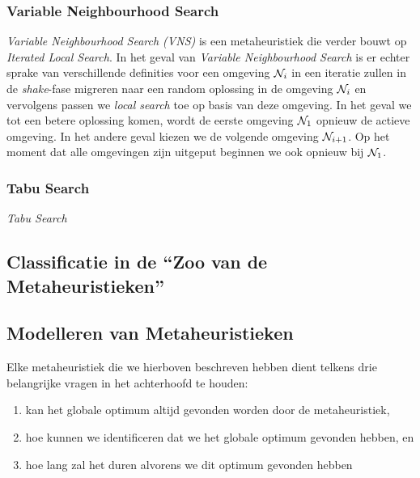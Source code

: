 \subsubsection{Variable Neighbourhood Search}

\emph{Variable Neighbourhood Search (VNS)} is een metaheuristiek die verder bouwt op \emph{Iterated Local Search}. In het geval van \emph{Variable Neighbourhood Search} is er echter sprake van verschillende definities voor een omgeving $\mathcal{N}_i$ in een iteratie zullen in de \emph{shake}-fase migreren naar een random oplossing in de omgeving $\mathcal{N}_i$ en vervolgens passen we \emph{local search} toe op basis van deze omgeving. In het geval we tot een betere oplossing komen, wordt de eerste omgeving $\mathcal{N}_1$ opnieuw de actieve omgeving. In het andere geval kiezen we de volgende omgeving $\mathcal{N}_{i+1}$. Op het moment dat alle omgevingen zijn uitgeput beginnen we ook opnieuw bij $\mathcal{N}_1$.%

\subsubsection{Tabu Search}

\emph{Tabu Search}

\subsection{Classificatie in de ``Zoo van de Metaheuristieken''}

\subsection{Modelleren van Metaheuristieken}

Elke metaheuristiek die we hierboven beschreven hebben dient telkens drie belangrijke vragen in het achterhoofd te houden\cite{DBLP:journals/jc/ShonkwilerV94}:
\begin{enumerate}
 \item kan het globale optimum altijd gevonden worden door de metaheuristiek,
 \item hoe kunnen we identificeren dat we het globale optimum gevonden hebben, en
 \item hoe lang zal het duren alvorens we dit optimum gevonden hebben
\end{enumerate}


